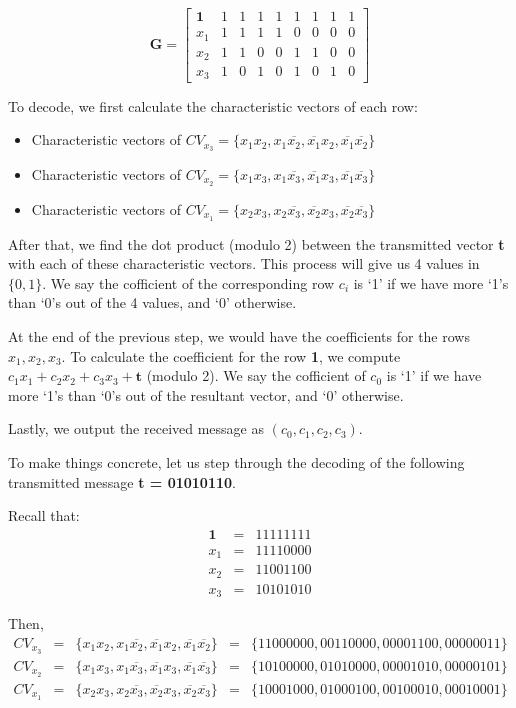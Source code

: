 \documentclass[12pt, a4paper]{article}
\begin{document}
$$
\textbf{G} = 
\left[
\begin{array}{c|cccccccc}
\textbf{1} 			& 1 & 1 & 1 & 1 & 1 & 1 & 1 & 1\\
\textbf{$x_1$} 		& 1 & 1 & 1 & 1 & 0 & 0 & 0 & 0\\
\textbf{$x_2$} 		& 1 & 1 & 0 & 0 & 1 & 1 & 0 & 0\\
\textbf{$x_3$} 		& 1 & 0 & 1 & 0 & 1 & 0 & 1 & 0
\end{array}
\right]
$$

To decode, we first calculate the characteristic vectors of each row:
\begin{itemize}
\item Characteristic vectors of $CV_{x_3} = \{x_1x_2, x_1\overline{x_2}, \overline{x_1}x_2, \overline{x_1}\overline{x_2}\}$
\item Characteristic vectors of $CV_{x_2} = \{x_1x_3, x_1\overline{x_3}, \overline{x_1}x_3, \overline{x_1}\overline{x_3}\}$
\item Characteristic vectors of $CV_{x_1} = \{x_2x_3, x_2\overline{x_3}, \overline{x_2}x_3, \overline{x_2}\overline{x_3}\}$
\end{itemize}
After that, we find the dot product (modulo 2) between the transmitted vector \textbf{t} with each of these characteristic vectors. This process will give us 4 values in $\{0,1\}$. We say the cofficient of the corresponding row $c_i$ is `1' if we have more `1's than `0's out of the 4 values, and `0' otherwise.

At the end of the previous step, we would have the coefficients for the rows $x_1, x_2, x_3$. To calculate the coefficient for the row \textbf{1}, we compute $c_1x_1 + c_2x_2 + c_3x_3 + \textbf{t}$ (modulo 2). We say the cofficient of $c_0$ is `1' if we have more `1's than `0's out of the resultant vector, and `0' otherwise.

Lastly, we output the received message as $(c_0, c_1, c_2, c_3)$.

To make things concrete, let us step through the decoding of the following transmitted message \textbf{t = 01010110}.

Recall that:
$$
\begin{array}{ccc}
\textbf{1} & = &11111111\\
x_1 & = & 11110000\\
x_2 & = & 11001100\\
x_3 & = &10101010
\end{array}
$$

Then,
$$
\begin{array}{ccccc}
CV_{x_3} & = & \{x_1x_2, x_1\overline{x_2}, \overline{x_1}x_2, \overline{x_1}\overline{x_2}\} & = & \{11000000, 00110000, 00001100, 00000011\}\\
CV_{x_2} & = & \{x_1x_3, x_1\overline{x_3}, \overline{x_1}x_3, \overline{x_1}\overline{x_3}\} & = & \{10100000, 01010000, 00001010, 00000101\}\\
CV_{x_1} & = & \{x_2x_3, x_2\overline{x_3}, \overline{x_2}x_3, \overline{x_2}\overline{x_3}\} & = & \{10001000, 01000100, 00100010, 00010001\}
\end{array}
$$
\end{document}

